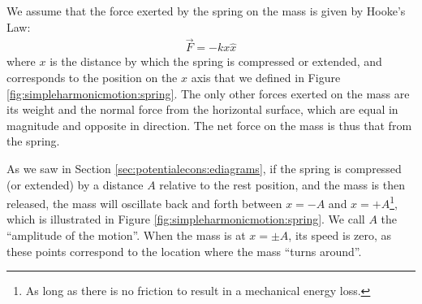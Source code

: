 We assume that the force exerted by the spring on the mass is given by Hooke's Law:
\begin{align*}
\vec F = -kx \hat x
\end{align*}
where $x$ is the distance by which the spring is compressed or extended, and corresponds to the position on the $x$ axis that we defined in Figure \ref{fig:simpleharmonicmotion:spring}. The only other forces exerted on the mass are its weight and the normal force from the horizontal surface, which are equal in magnitude and opposite in direction. The net force on the mass is thus that from the spring. 

As we saw in Section \ref{sec:potentialecons:ediagrams}, if the spring is compressed  (or extended) by a distance $A$ relative to the rest position, and the mass is then released, the mass will oscillate back and forth between $x=-A$ and $x=+A$\footnote{As long as there is no friction to result in a mechanical energy loss.}, which is illustrated in Figure \ref{fig:simpleharmonicmotion:spring}. We call $A$ the ``amplitude of the motion''. When the mass is at $x=\pm A$, its speed is zero, as these points correspond to the location where the mass ``turns around''.


